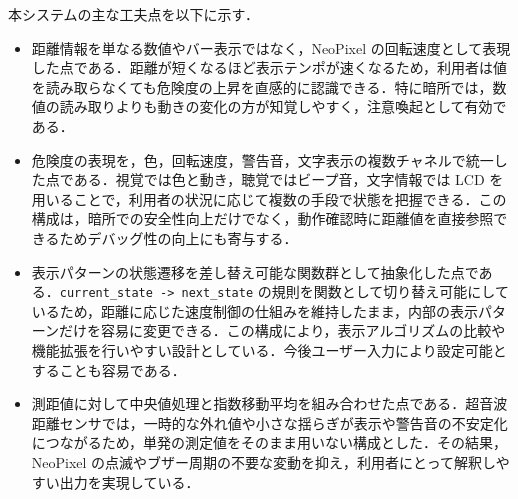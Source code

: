 \documentclass[a4paper,fontsize=11pt,line_length=40zw,number_of_lines=35,baselineskip=1.7zw]{jlreq}
\begin{document}
本システムの主な工夫点を以下に示す．

\begin{itemize}
  \item 距離情報を単なる数値やバー表示ではなく，NeoPixel の回転速度として表現した点である．距離が短くなるほど表示テンポが速くなるため，利用者は値を読み取らなくても危険度の上昇を直感的に認識できる．特に暗所では，数値の読み取りよりも動きの変化の方が知覚しやすく，注意喚起として有効である．\cite{gripon2026MicrocontrollerBasedCarParking}
  \item 危険度の表現を，色，回転速度，警告音，文字表示の複数チャネルで統一した点である．視覚では色と動き，聴覚ではビープ音，文字情報では LCD を用いることで，利用者の状況に応じて複数の手段で状態を把握できる．この構成は，暗所での安全性向上だけでなく，動作確認時に距離値を直接参照できるためデバッグ性の向上にも寄与する．
  \item 表示パターンの状態遷移を差し替え可能な関数群として抽象化した点である．\lstinline|current_state -> next_state| の規則を関数として切り替え可能にしているため，距離に応じた速度制御の仕組みを維持したまま，内部の表示パターンだけを容易に変更できる．この構成により，表示アルゴリズムの比較や機能拡張を行いやすい設計としている．今後ユーザー入力により設定可能とすることも容易である．
  \item 測距値に対して中央値処理と指数移動平均を組み合わせた点である．超音波距離センサでは，一時的な外れ値や小さな揺らぎが表示や警告音の不安定化につながるため，単発の測定値をそのまま用いない構成とした．その結果，NeoPixel の点滅やブザー周期の不要な変動を抑え，利用者にとって解釈しやすい出力を実現している．
\end{itemize}

\printbibliography[title=参考文献]
\end{document}
